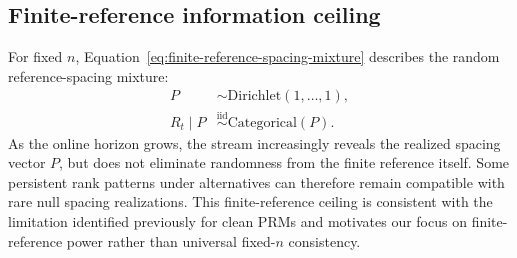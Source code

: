 \subsection{Finite-reference information ceiling}

For fixed \(n\), Equation~\eqref{eq:finite-reference-spacing-mixture} describes the random reference-spacing mixture:
\begin{equation}
\begin{aligned}
P&\sim\mathrm{Dirichlet}(1,\ldots,1),\\
R_t\mid P&\overset{\mathrm{iid}}{\sim}\mathrm{Categorical}(P).
\end{aligned}
\label{eq:finite-reference-spacing-mixture}
\end{equation}
As the online horizon grows, the stream increasingly reveals the realized spacing vector \(P\), but does not eliminate randomness from the finite reference itself. Some persistent rank patterns under alternatives can therefore remain compatible with rare null spacing realizations. This finite-reference ceiling is consistent with the limitation identified previously for clean PRMs \cite{KuangXia2026} and motivates our focus on finite-reference power rather than universal fixed-\(n\) consistency.
